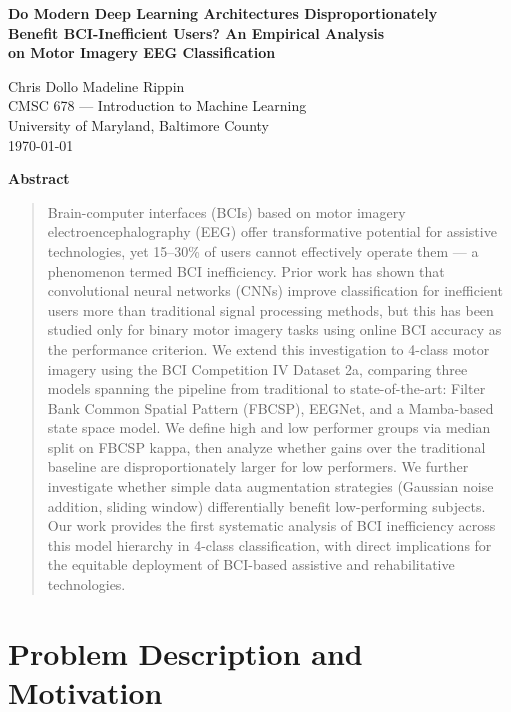 \documentclass{article}
\renewenvironment{abstract}
 {\small\begin{center}\bfseries Abstract\end{center}\begin{quotation}}
 {\end{quotation}}
\begin{document}
\begin{center}
{\LARGE \textbf{Do Modern Deep Learning Architectures Disproportionately\\
Benefit BCI-Inefficient Users? An Empirical Analysis\\
on Motor Imagery EEG Classification}}

\vspace{1em}

{\large Chris Dollo \quad Madeline Rippin}\\[0.3em]
{\normalsize CMSC 678 --- Introduction to Machine Learning\\
University of Maryland, Baltimore County}\\[0.3em]
{\small \today}
\end{center}

\vspace{1em}

\begin{abstract}
Brain-computer interfaces (BCIs) based on motor imagery electroencephalography (EEG) offer transformative potential for assistive technologies, yet 15--30\% of users cannot effectively operate them --- a phenomenon termed BCI inefficiency. Prior work has shown that convolutional neural networks (CNNs) improve classification for inefficient users more than traditional signal processing methods, but this has been studied only for binary motor imagery tasks using online BCI accuracy as the performance criterion. We extend this investigation to 4-class motor imagery using the BCI Competition IV Dataset 2a, comparing three models spanning the pipeline from traditional to state-of-the-art: Filter Bank Common Spatial Pattern (FBCSP), EEGNet, and a Mamba-based state space model. We define high and low performer groups via median split on FBCSP kappa, then analyze whether gains over the traditional baseline are disproportionately larger for low performers. We further investigate whether simple data augmentation strategies (Gaussian noise addition, sliding window) differentially benefit low-performing subjects. Our work provides the first systematic analysis of BCI inefficiency across this model hierarchy in 4-class classification, with direct implications for the equitable deployment of BCI-based assistive and rehabilitative technologies.
\end{abstract}

\section{Problem Description and Motivation}
\end{document}
